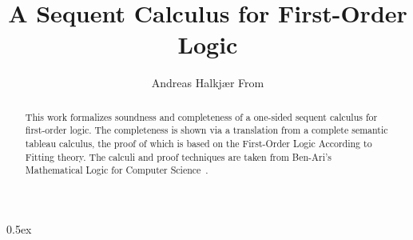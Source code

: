 \documentclass[11pt,a4paper]{article}
\title{A Sequent Calculus for First-Order Logic}
\author{Andreas Halkjær From}
\begin{document}
\maketitle

\begin{abstract}
  This work formalizes soundness and completeness of a one-sided sequent calculus for first-order logic.
  The completeness is shown via a translation from a complete semantic tableau calculus, the proof of which is based on the First-Order Logic According to Fitting theory.
  The calculi and proof techniques are taken from Ben-Ari's Mathematical Logic for Computer Science~\cite{BenAri2012}.
\end{abstract}

\tableofcontents
\newpage

\parindent 0pt\parskip 0.5ex





\end{document}
